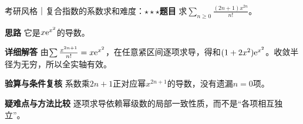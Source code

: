 \begin{example}{考研风格｜复合指数的系数求和}{难度：$\star\star\star$}\label{ic:ex:delta_series:weightedexp}\textbf{题目} 求$\sum_{n\ge0}\frac{(2n+1)x^{2n}}{n!}$。\par \textbf{思路} 它是$x\mathrm{e}^{x^2}$的导数。\par \textbf{详细解答} 由$\sum \frac{x^{2n+1}}{n!}=x\mathrm{e}^{x^2}$，在任意紧区间逐项求导，得和$(1+2x^2)\mathrm{e}^{x^2}$。收敛半径为无穷，所以全实轴有效。\par \textbf{验算与条件复核} 系数乘$2n+1$正对应幂$x^{2n+1}$的导数，没有遗漏$n=0$项。\par \textbf{疑难点与方法比较} 逐项求导依赖幂级数的局部一致性质，而不是“各项相互独立”。\end{example}
